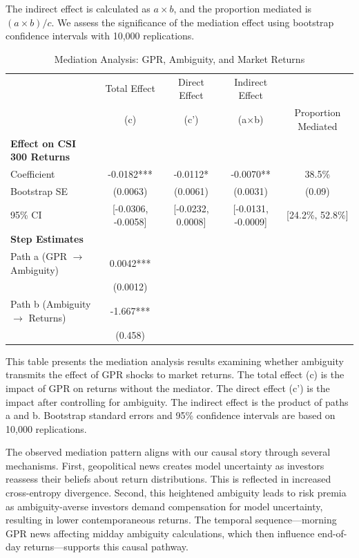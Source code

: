 \documentclass[preprint,12pt,authoryear]{elsarticle}
\begin{document}
The indirect effect is calculated as $a \times b$, and the proportion mediated is $(a \times b) / c$. We assess the significance of the mediation effect using bootstrap confidence intervals with 10,000 replications.

\begin{table}
\centering
\caption{Mediation Analysis: GPR, Ambiguity, and Market Returns}
\label{tab:mediation}
\begin{threeparttable}
\begin{tabular*}{\textwidth}{@{\extracolsep{\fill}} lcccc @{\extracolsep{\fill}}}
\toprule
& Total Effect & Direct Effect & Indirect Effect & \\
& (c) & (c') & (a$\times$b) & Proportion Mediated \\
\midrule
\midrule
\textbf{Effect on CSI 300 Returns} & & & & \\
Coefficient & -0.0182*** & -0.0112* & -0.0070** & 38.5\% \\
Bootstrap SE & (0.0063) & (0.0061) & (0.0031) & (0.09) \\
95\% CI & [-0.0306, -0.0058] & [-0.0232, 0.0008] & [-0.0131, -0.0009] & [24.2\%, 52.8\%] \\
\midrule
\textbf{Step Estimates} & & & & \\
Path a (GPR $\rightarrow$ Ambiguity) & 0.0042*** & & & \\
& (0.0012) & & & \\
Path b (Ambiguity $\rightarrow$ Returns) & -1.667*** & & & \\
& (0.458) & & & \\
\bottomrule
\end{tabular*}
\begin{tablenotes}[flushleft]
\small
\item[] This table presents the mediation analysis results examining whether ambiguity transmits the effect of GPR shocks to market returns. The total effect (c) is the impact of GPR on returns without the mediator. The direct effect (c') is the impact after controlling for ambiguity. The indirect effect is the product of paths a and b. Bootstrap standard errors and 95\% confidence intervals are based on 10,000 replications.
\end{tablenotes}
\end{threeparttable}
\end{table}

The observed mediation pattern aligns with our causal story through several mechanisms. First, geopolitical news creates model uncertainty as investors reassess their beliefs about return distributions. This is reflected in increased cross-entropy divergence. Second, this heightened ambiguity leads to risk premia as ambiguity-averse investors demand compensation for model uncertainty, resulting in lower contemporaneous returns. The temporal sequence---morning GPR news affecting midday ambiguity calculations, which then influence end-of-day returns---supports this causal pathway.
\end{document}
